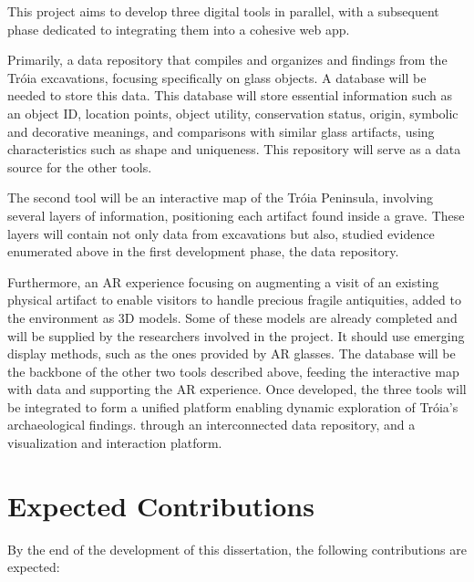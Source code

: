 This project aims to develop three digital tools in parallel, with a subsequent phase dedicated to 
integrating them into a cohesive web app.


Primarily, a data repository that compiles and organizes and findings from 
the Tróia excavations, focusing specifically on glass objects. A database will be needed to store this data. 
This database will store essential information such as an object ID, location points, object utility,
conservation status, origin, symbolic and decorative meanings, and comparisons with similar glass artifacts, using characteristics such as shape and uniqueness. 
This repository will serve as a data source for the other tools.


The second tool will be an interactive map of the Tróia Peninsula, involving several layers of information, positioning each 
artifact found inside a grave. These layers will contain not only data from excavations but also, 
studied evidence enumerated above in the first development phase, the data repository.
 
Furthermore, an \gls{AR} experience focusing on augmenting a visit of an existing physical 
artifact to enable visitors to handle precious fragile antiquities, added to the environment as \gls{3D} models. Some of these models are already completed and will be supplied by the researchers involved in the project.
It should use emerging display methods, such as the ones provided by \gls{AR} glasses.
The database will be the backbone of the other two tools described above, feeding the interactive map with data and supporting the \gls{AR} experience.
Once developed, the three tools will be integrated to form a unified platform enabling dynamic exploration of Tróia's archaeological findings.
through an interconnected data repository, and a visualization and interaction platform.




\section{Expected Contributions}
\label{sec:expected_contributions}


By the end of the development of this dissertation, the following contributions are expected:


